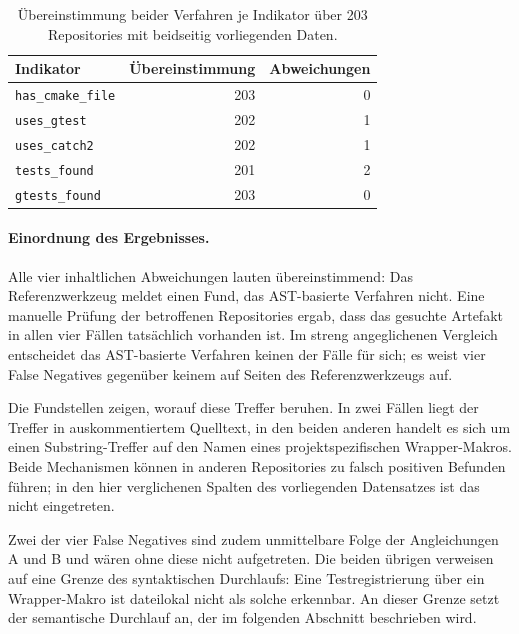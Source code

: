 \documentclass[12pt,a4paper,twoside,headsepline,parskip=half]{scrreprt}
\begin{document}
\begin{table}[H]
    \centering
    \small
    \begin{tabular}{l r r}
        \toprule
        \textbf{Indikator} & \textbf{Übereinstimmung} & \textbf{Abweichungen} \\
        \midrule
        \texttt{has\_cmake\_file}  & 203 & 0 \\
        \texttt{uses\_gtest}       & 202 & 1 \\
        \texttt{uses\_catch2}      & 202 & 1 \\
        \texttt{tests\_found}      & 201 & 2 \\
        \texttt{gtests\_found}     & 203 & 0 \\
        \bottomrule
    \end{tabular}
    \caption{Übereinstimmung beider Verfahren je Indikator über 203 Repositories mit
    beidseitig vorliegenden Daten.}
    \label{tab:impl-paritaet}
\end{table}

\paragraph{Einordnung des Ergebnisses.}
Alle vier inhaltlichen Abweichungen lauten übereinstimmend: Das Referenzwerkzeug
meldet einen Fund, das AST-basierte Verfahren nicht. Eine manuelle Prüfung der
betroffenen Repositories ergab, dass das gesuchte Artefakt in allen vier Fällen
tatsächlich vorhanden ist. Im streng angeglichenen Vergleich entscheidet das
AST-basierte Verfahren keinen der Fälle für sich; es weist vier False Negatives
gegenüber keinem auf Seiten des Referenzwerkzeugs auf.

Die Fundstellen zeigen, worauf diese Treffer beruhen. In zwei Fällen liegt der Treffer in auskommentiertem Quelltext, in den beiden
anderen handelt es sich um einen Substring-Treffer auf den Namen eines
projektspezifischen Wrapper-Makros. Beide Mechanismen können in anderen Repositories
zu falsch positiven Befunden führen; in den hier verglichenen Spalten des
vorliegenden Datensatzes ist das nicht eingetreten.

Zwei der vier False Negatives sind zudem unmittelbare Folge der Angleichungen
A und B und wären ohne diese nicht aufgetreten. Die beiden übrigen verweisen auf eine
Grenze des syntaktischen Durchlaufs: Eine Testregistrierung über ein Wrapper-Makro
ist dateilokal nicht als solche erkennbar. An dieser Grenze setzt der semantische
Durchlauf an, der im folgenden Abschnitt beschrieben wird.
\end{document}
